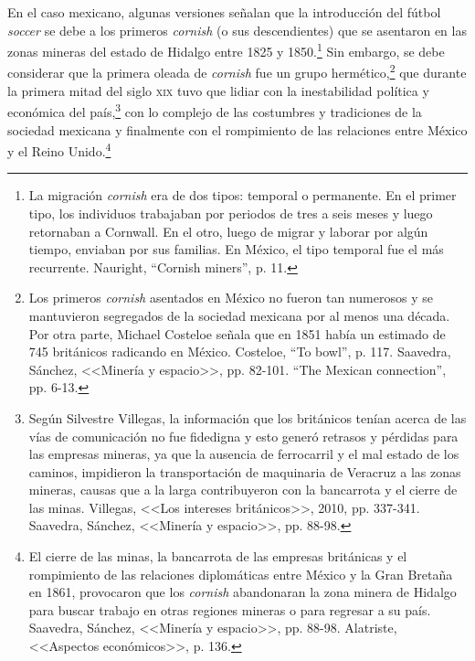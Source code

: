 \documentclass[11pt,a5paper,twoside]{book} %
\begin{document}
En el caso mexicano, algunas versiones señalan que la introducción del fútbol \emph{soccer} se debe a los primeros \emph{cornish} (o sus descendientes) que se asentaron en las zonas mineras del estado de Hidalgo entre 1825 y 1850.\footnote{La migración \emph{cornish} era de dos tipos: temporal o permanente. En el primer tipo, los individuos trabajaban por periodos de tres a seis meses y luego retornaban a Cornwall. En el otro, luego de migrar y laborar por algún tiempo, enviaban por sus familias. En México, el tipo temporal fue el más recurrente. Nauright, ``Cornish miners'', p. 11.} Sin embargo, se debe considerar que la primera oleada de \emph{cornish} fue un grupo hermético,\footnote{Los primeros \emph{cornish} asentados en México no fueron tan numerosos y se mantuvieron segregados de la sociedad mexicana por al menos una década. Por otra parte, Michael Costeloe señala que en 1851 había un estimado de 745 británicos radicando en México. Costeloe, ``To bowl'', p. 117. Saavedra, Sánchez, <<Minería y espacio>>, pp. 82-101. ``The Mexican connection'', pp. 6-13.} que durante la primera mitad del siglo \textsc{xix} tuvo que lidiar con la inestabilidad política y económica del país,\footnote{Según Silvestre Villegas, la información que los británicos tenían acerca de las vías de comunicación no fue fidedigna y esto generó retrasos y pérdidas para las empresas mineras, ya que la ausencia de ferrocarril y el mal estado de los caminos, impidieron la transportación de maquinaria de Veracruz a las zonas mineras, causas que a la larga contribuyeron con la bancarrota y el cierre de las minas. Villegas, <<Los intereses británicos>>, 2010, pp. 337-341. Saavedra, Sánchez, <<Minería y espacio>>, pp. 88-98.} con lo complejo de las costumbres y tradiciones de la sociedad mexicana y finalmente con el rompimiento de las relaciones entre México y el Reino Unido.\footnote{El cierre de las minas, la bancarrota de las empresas británicas y el rompimiento de las relaciones diplomáticas entre México y la Gran Bretaña en 1861, provocaron que los \emph{cornish} abandonaran la zona minera de Hidalgo para buscar trabajo en otras regiones mineras o para regresar a su país. Saavedra, Sánchez, <<Minería y espacio>>, pp. 88-98. Alatriste, <<Aspectos económicos>>, p. 136.}
\end{document}
